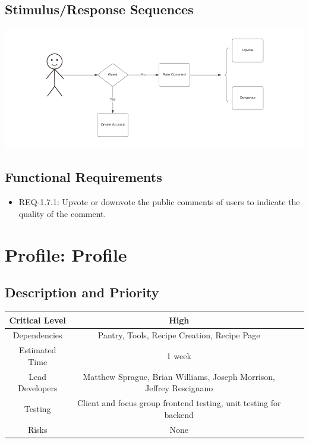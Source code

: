 \documentclass{scrreprt}
\begin{document}
\subsection{Stimulus/Response Sequences}

\includegraphics{FlowCharts/Recipe-Comment-Rating.png}

\subsection{Functional Requirements}

\begin{itemize}
    \item REQ-1.7.1: Upvote or downvote the public comments of users to indicate the quality of the comment.
\end{itemize}

\section{Profile: Profile}

\subsection{Description and Priority}
\begin{center}
    \begin{tabular}{| c | c | c | c |}
        \hline
        Critical Level & High \\
        \hline
        Dependencies & Pantry, Tools, Recipe Creation, Recipe Page \\
        \hline
        Estimated Time & 1 week \\
        \hline
        Lead Developers & Matthew Sprague, Brian Williams, Joseph Morrison, Jeffrey Rescignano \\
        \hline
        Testing & Client and focus group frontend testing, unit testing for backend \\
        \hline
        Risks & None \\
        \hline
    \end{tabular}
\end{center}
\end{document}
